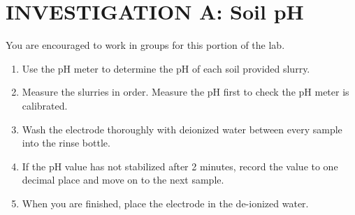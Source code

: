 \documentclass[
  letterpaper,
  twocolumn,
  portrait]{scrbook}
\providecommand{\tightlist}{%
  \setlength{\itemsep}{0pt}\setlength{\parskip}{0pt}}\usepackage{longtable,booktabs,array}
\begin{document}
\hypertarget{investigation-a-soil-ph}{%
\section{INVESTIGATION A: Soil pH}\label{investigation-a-soil-ph}}

You are encouraged to work in groups for this portion of the lab.

\begin{enumerate}
\def\labelenumi{\arabic{enumi}.}
\tightlist
\item
  Use the pH meter to determine the pH of each soil provided slurry.
\item
  Measure the slurries in order. Measure the pH first to check the pH
  meter is calibrated.
\item
  Wash the electrode thoroughly with deionized water between every
  sample into the rinse bottle.
\item
  If the pH value has not stabilized after 2 minutes, record the value
  to one decimal place and move on to the next sample.
\item
  When you are finished, place the electrode in the de-ionized water.
\end{enumerate}

 
  \providecommand{\huxb}[2]{\arrayrulecolor[RGB]{#1}\global\arrayrulewidth=#2pt}
  \providecommand{\huxvb}[2]{\color[RGB]{#1}\vrule width #2pt}
  \providecommand{\huxtpad}[1]{\rule{0pt}{#1}}
  \providecommand{\huxbpad}[1]{\rule[-#1]{0pt}{#1}}
\end{document}
